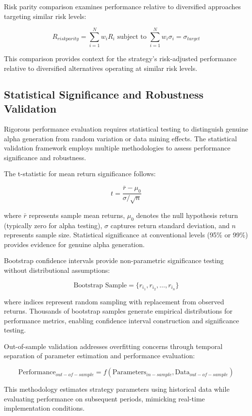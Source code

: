 \documentclass[
  american,
  11pt,
  11pt,
  letterpaper,
  onecolumn]{article}
\begin{document}
Risk parity comparison examines performance relative to diversified
approaches targeting similar risk levels:

\[R_{risk parity} = \sum_{i=1}^{N} w_i R_i \text{ subject to } \sum_{i=1}^{N} w_i \sigma_i = \sigma_{target}\]

This comparison provides context for the strategy's risk-adjusted
performance relative to diversified alternatives operating at similar
risk levels.

\subsection{Statistical Significance and Robustness
Validation}\label{statistical-significance-and-robustness-validation}

Rigorous performance evaluation requires statistical testing to
distinguish genuine alpha generation from random variation or data
mining effects. The statistical validation framework employs multiple
methodologies to assess performance significance and robustness.

The t-statistic for mean return significance follows:

\[t = \frac{\bar{r} - \mu_0}{\sigma / \sqrt{n}}\]

where \(\bar{r}\) represents sample mean returns, \(\mu_0\) denotes the
null hypothesis return (typically zero for alpha testing), \(\sigma\)
captures return standard deviation, and \(n\) represents sample size.
Statistical significance at conventional levels (95\% or 99\%) provides
evidence for genuine alpha generation.

Bootstrap confidence intervals provide non-parametric significance
testing without distributional assumptions:

\[\text{Bootstrap Sample} = \{r_{i_1}, r_{i_2}, \ldots, r_{i_n}\}\]

where indices represent random sampling with replacement from observed
returns. Thousands of bootstrap samples generate empirical distributions
for performance metrics, enabling confidence interval construction and
significance testing.

Out-of-sample validation addresses overfitting concerns through temporal
separation of parameter estimation and performance evaluation:

\[\text{Performance}_{out-of-sample} = f(\text{Parameters}_{in-sample}, \text{Data}_{out-of-sample})\]

This methodology estimates strategy parameters using historical data
while evaluating performance on subsequent periods, mimicking real-time
implementation conditions.
\end{document}
